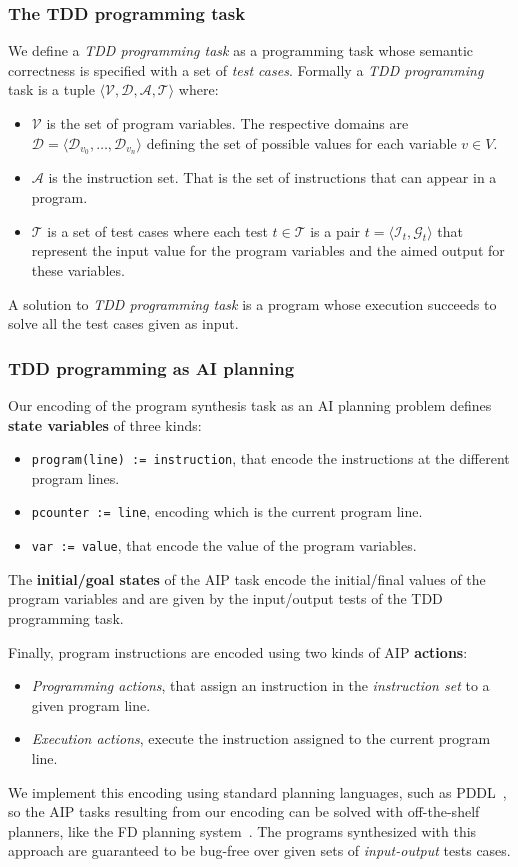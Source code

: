 \documentclass[10pt,a4paper]{paper}
\newcommand{\tup}[1]{{\langle #1 \rangle}}
\begin{document}
\subsubsection{The TDD programming task}
We define a {\em TDD programming task} as a programming task whose semantic correctness is specified with a set of {\em test cases}. Formally a {\em TDD programming} task is a tuple $\tup{{\mathcal V},{\mathcal D},{\mathcal A}, {\mathcal T}}$ where:
\begin{itemize}
\item ${\mathcal V}$ is the set of program variables.  The respective domains are ${\mathcal D}=\tup{{\mathcal D}_{v_0}, \ldots, {\mathcal D}_{v_n}}$ defining the set of possible values for each variable $v\in V$.
\item ${\mathcal A}$ is the instruction set. That is the set of instructions that can appear in a program.
\item ${\mathcal T}$ is a set of test cases where each test $t\in {\mathcal T}$ is a pair $t=\tup{{\mathcal I}_t,{\mathcal G}_t}$ that represent the input value for the program variables and the aimed output for these variables.
\end{itemize}
A solution to {\em TDD programming task} is a program whose execution succeeds to solve all the test cases given as input.  

\subsubsection{TDD programming as AI planning}
Our encoding of the program synthesis task as an AI planning problem defines {\bf state variables} of three kinds:
\begin{itemize}
\item {\tt program(line) := instruction}, that encode the instructions at the different program lines.
\item {\tt pcounter := line}, encoding which is the current program line.
\item {\tt var := value}, that encode the value of the program variables.
\end {itemize}

The {\bf initial/goal states} of the AIP task encode the initial/final values of the program variables and are given by the input/output tests of the TDD programming task.

Finally, program instructions are encoded using two kinds of AIP {\bf actions}:
\begin{itemize}
\item {\it Programming actions}, that assign an instruction in the {\em instruction set} to a given program line.
\item {\it Execution actions}, execute the instruction assigned to the current program line.
\end{itemize}
We implement this encoding using standard planning languages, such as PDDL~\cite{fox2003pddl2}, so the AIP tasks resulting from our encoding can be solved with off-the-shelf planners, like the {\sc FD} planning system~\cite{helmert2006fast}. The programs synthesized with this approach are guaranteed to be bug-free over given sets of {\em input-output} tests cases.
\end{document}
